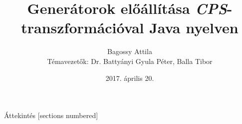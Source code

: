 \documentclass{beamer}
\title{Generátorok előállítása \textit{CPS}-transzformációval Java nyelven}
\date{2017. április 20.}
\author[My name]{Bagossy Attila\\ \footnotesize Témavezetők: Dr. Battyányi Gyula Péter, Balla Tibor \vspace{5em}}
\institute{Debreceni Egyetem, Informatikai Kar, Számítógéptudományi Tanszék}
\begin{document}
  \maketitle

  \begin{frame}{Áttekintés}
    [sections numbered]
    \tableofcontents[hideallsubsections]
  \end{frame}

  

  

  

  

\end{document}

